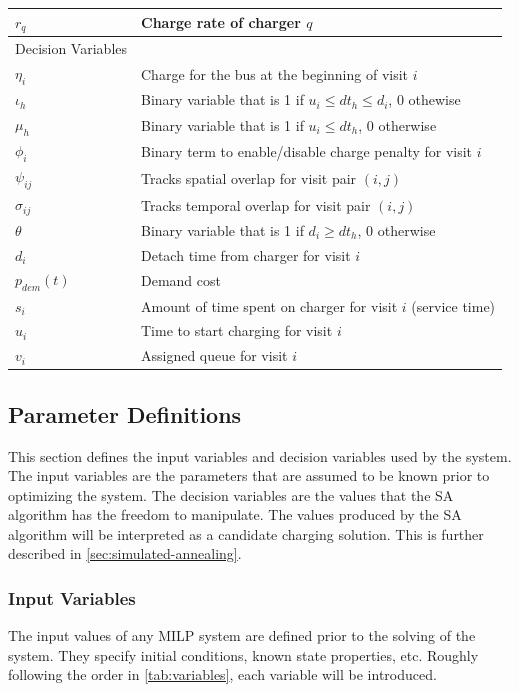 \documentclass[11pt,a4paper,final]{article}
\begin{document}
\begin{table}[htbp]
\begin{tabular}{ll}
\(r_q\) & Charge rate of charger \(q\)\\[0pt]
\hline
Decision Variables & \\[0pt]
\(\eta_i\) & Charge for the bus at the beginning of visit \(i\)\\[0pt]
\(\iota_h\) & Binary variable that is 1 if \(u_i \le dt_h \le d_i\), 0 othewise\\[0pt]
\(\mu_h\) & Binary variable that is 1 if \(u_i \le dt_h\), 0 otherwise\\[0pt]
\(\phi_i\) & Binary term to enable/disable charge penalty for visit \(i\)\\[0pt]
\(\psi_{ij}\) & Tracks spatial overlap for visit pair \((i,j)\)\\[0pt]
\(\sigma_{ij}\) & Tracks temporal overlap for visit pair \((i,j)\)\\[0pt]
\(\theta\) & Binary variable that is 1 if \(d_i \ge dt_h\), 0 otherwise\\[0pt]
\(d_i\) & Detach time from charger for visit \(i\)\\[0pt]
\(p_{dem}(t)\) & Demand cost\\[0pt]
\(s_i\) & Amount of time spent on charger for visit \(i\) (service time)\\[0pt]
\(u_i\) & Time to start charging for visit \(i\)\\[0pt]
\(v_i\) & Assigned queue for visit \(i\)\\[0pt]
\hline
\end{tabular}
\end{table}

\subsection{Parameter Definitions}
\label{sec:parameter-definitions}
This section defines the input variables and decision variables used by the system. The input variables are the
parameters that are assumed to be known prior to optimizing the system. The decision variables are the values that the
SA algorithm has the freedom to manipulate. The values produced by the SA algorithm will be interpreted as a candidate
charging solution. This is further described in \ref{sec:simulated-annealing}.

\subsubsection{Input Variables}
\label{sec:input-variables}
The input values of any MILP system are defined prior to the solving of the system. They specify initial conditions,
known state properties, etc. Roughly following the order in \ref{tab:variables}, each variable will be introduced.
\end{document}
